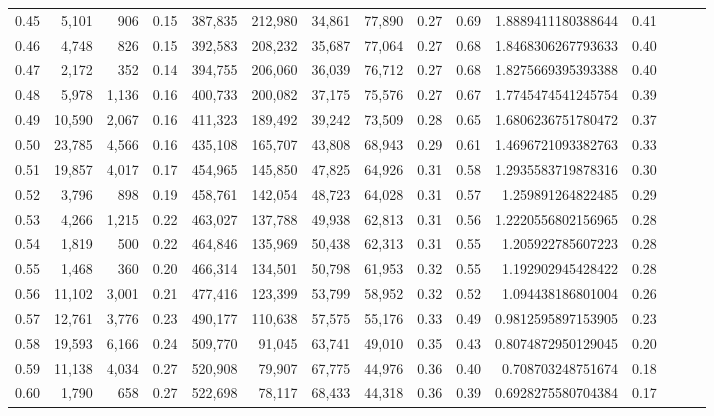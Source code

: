 \begin{tabular}{rrrrrrrrrrrrrrr}
0.45 &   5,101 &    906 &  0.15 &  387,835 &  212,980 &   34,861 &   77,890 &  0.27 &  0.69 &    1.8889411180388644 &      0.41 \\
0.46 &   4,748 &    826 &  0.15 &  392,583 &  208,232 &   35,687 &   77,064 &  0.27 &  0.68 &    1.8468306267793633 &      0.40 \\
0.47 &   2,172 &    352 &  0.14 &  394,755 &  206,060 &   36,039 &   76,712 &  0.27 &  0.68 &    1.8275669395393388 &      0.40 \\
0.48 &   5,978 &  1,136 &  0.16 &  400,733 &  200,082 &   37,175 &   75,576 &  0.27 &  0.67 &    1.7745474541245754 &      0.39 \\
0.49 &  10,590 &  2,067 &  0.16 &  411,323 &  189,492 &   39,242 &   73,509 &  0.28 &  0.65 &    1.6806236751780472 &      0.37 \\
0.50 &  23,785 &  4,566 &  0.16 &  435,108 &  165,707 &   43,808 &   68,943 &  0.29 &  0.61 &    1.4696721093382763 &      0.33 \\
0.51 &  19,857 &  4,017 &  0.17 &  454,965 &  145,850 &   47,825 &   64,926 &  0.31 &  0.58 &    1.2935583719878316 &      0.30 \\
0.52 &   3,796 &    898 &  0.19 &  458,761 &  142,054 &   48,723 &   64,028 &  0.31 &  0.57 &     1.259891264822485 &      0.29 \\
0.53 &   4,266 &  1,215 &  0.22 &  463,027 &  137,788 &   49,938 &   62,813 &  0.31 &  0.56 &    1.2220556802156965 &      0.28 \\
0.54 &   1,819 &    500 &  0.22 &  464,846 &  135,969 &   50,438 &   62,313 &  0.31 &  0.55 &     1.205922785607223 &      0.28 \\
0.55 &   1,468 &    360 &  0.20 &  466,314 &  134,501 &   50,798 &   61,953 &  0.32 &  0.55 &     1.192902945428422 &      0.28 \\
0.56 &  11,102 &  3,001 &  0.21 &  477,416 &  123,399 &   53,799 &   58,952 &  0.32 &  0.52 &     1.094438186801004 &      0.26 \\
0.57 &  12,761 &  3,776 &  0.23 &  490,177 &  110,638 &   57,575 &   55,176 &  0.33 &  0.49 &    0.9812595897153905 &      0.23 \\
0.58 &  19,593 &  6,166 &  0.24 &  509,770 &   91,045 &   63,741 &   49,010 &  0.35 &  0.43 &    0.8074872950129045 &      0.20 \\
0.59 &  11,138 &  4,034 &  0.27 &  520,908 &   79,907 &   67,775 &   44,976 &  0.36 &  0.40 &     0.708703248751674 &      0.18 \\
0.60 &   1,790 &    658 &  0.27 &  522,698 &   78,117 &   68,433 &   44,318 &  0.36 &  0.39 &    0.6928275580704384 &      0.17 \\

\end{tabular}
